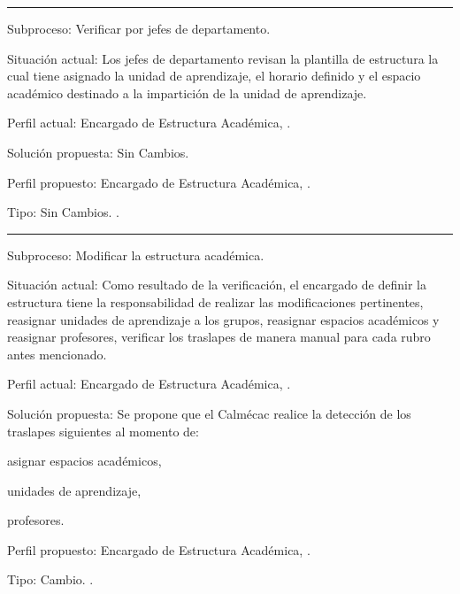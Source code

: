 \hrule
\vspace{0.2cm}
\begin{Cdescription}
	\item[Subproceso:] Verificar por jefes de departamento.
	\item[Situación actual:] Los jefes de departamento revisan la plantilla de estructura la cual tiene asignado la unidad de aprendizaje, el horario definido y el espacio académico destinado a la impartición de la unidad de aprendizaje.
	\item[Perfil actual:] Encargado de Estructura Académica, .
	\item[Solución propuesta:] Sin Cambios.
	\item[Perfil propuesto:] Encargado de Estructura Académica, .
	\item[Tipo:] Sin Cambios.
.
\end{Cdescription}


\hrule
\vspace{0.2cm}
\begin{Cdescription}
	\item[Subproceso:] Modificar la estructura académica.
	\item[Situación actual:] Como resultado de la verificación, el encargado de definir la estructura tiene la responsabilidad de realizar las modificaciones pertinentes, reasignar unidades de aprendizaje a los grupos, reasignar espacios académicos y reasignar profesores, verificar los traslapes de manera manual para cada rubro antes mencionado.
	\item[Perfil actual:] Encargado de Estructura Académica, .
		\item[Solución propuesta:] Se propone que el Calmécac realice la detección de los traslapes siguientes al momento de:
	\begin{Citemize}
		\item asignar espacios académicos, 
		\item unidades de aprendizaje, 
		\item profesores.
	\end{Citemize}
	\item[Perfil propuesto:] Encargado de Estructura Académica, .
	\item[Tipo:] Cambio.
	.
\end{Cdescription}

